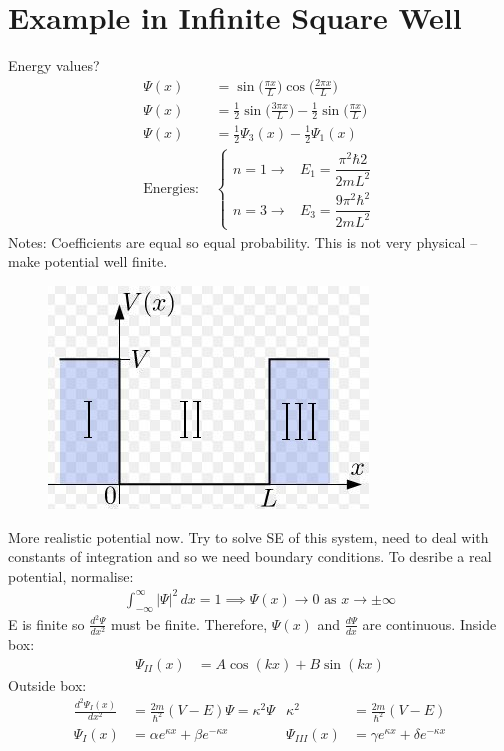 \documentclass[a4paper, 11pt, normalem]{report}
\begin{document}
\section{Example in Infinite Square Well}
Energy values?
\begin{align}
    \Psi(x) &= \sin\Big(\frac{\pi x}{L}\Big)\cos\Big(\frac{2\pi x}{L}\Big) \\
    \Psi(x) &= \frac{1}{2}\sin\Big(\frac{3\pi x}{L}\Big) - \frac{1}{2}\sin\Big(\frac{\pi x}{L}\Big) \\
    \Psi(x) &= \frac{1}{2}\Psi_{3}(x) - \frac{1}{2}\Psi_{1}(x) \\
    \text{Energies: }&
    \begin{cases}
        n = 1 \rightarrow& E_{1} = \dfrac{\pi^{2}\hbar{2}}{2mL^{2}} \\
        n = 3 \rightarrow& E_{3} = \dfrac{9\pi^{2}\hbar^{2}}{2mL^{2}}
    \end{cases}
\end{align}
Notes: Coefficients are equal so equal probability.
This is not very physical -- make potential well finite.
\begin{figure}[H]
    \centering
    \includegraphics{Finite.jpg}
\end{figure}
More realistic potential now.
Try to solve SE of this system, need to deal with constants of integration and so we need boundary conditions.
To desribe a real potential, normalise:
\begin{align}
    \int_{-\infty}^{\infty} |\Psi|^{2}\,dx = 1 \implies \Psi(x) \rightarrow 0 \text{ as } x \rightarrow \pm\infty
\end{align}
E is finite so $\frac{d^{2}\Psi}{dx^{2}}$ must be finite.
Therefore, $\Psi(x)$ and $\frac{d\Psi}{dx}$ are continuous.
Inside box:
\begin{align}
    \Psi_{II}(x) &= A\cos(kx) + B\sin(kx)
\end{align}
Outside box:
\begin{align}
    \frac{d^{2}\Psi_{I}(x)}{dx^{2}} &= \frac{2m}{\hbar^{2}}(V - E)\Psi = \kappa^{2}\Psi & \kappa^{2} &= \frac{2m}{\hbar^{2}}(V -E) \\
    \Psi_{I}(x) &= \alpha e^{\kappa x} + \beta e^{-\kappa x} & \Psi_{III}(x) &= \gamma e^{\kappa x} + \delta e^{-\kappa x}
\end{align}
\end{document}
